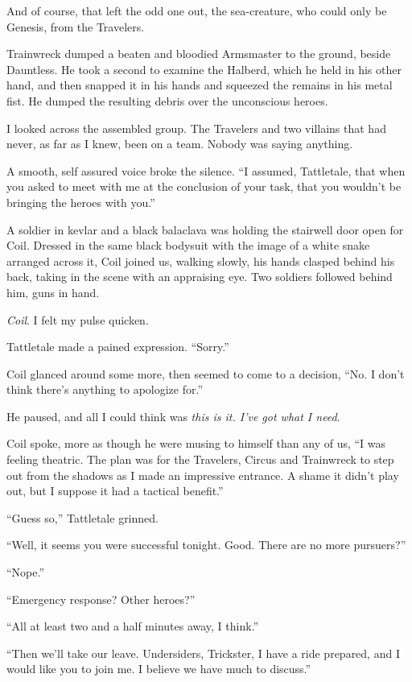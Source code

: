 And of course, that left the odd one out, the sea-creature, who could only be Genesis, from the Travelers.



Trainwreck dumped a beaten and bloodied Armsmaster to the ground, beside Dauntless.  He took a second to examine the Halberd, which he held in his other hand, and then snapped it in his hands and squeezed the remains in his metal fist.  He dumped the resulting debris over the unconscious heroes.



I looked across the assembled group.  The Travelers and two villains that had never, as far as I knew, been on a team.  Nobody was saying anything.



A smooth, self assured voice broke the silence.  ``I assumed, Tattletale, that when you asked to meet with me at the conclusion of your task, that you wouldn't be bringing the heroes with you.''



A soldier in kevlar and a black balaclava was holding the stairwell door open for Coil.  Dressed in the same black bodysuit with the image of a white snake arranged across it, Coil joined us, walking slowly, his hands clasped behind his back, taking in the scene with an appraising eye.  Two soldiers followed behind him, guns in hand.



\emph{Coil}.  I felt my pulse quicken.



Tattletale made a pained expression.  ``Sorry.''



Coil glanced around some more, then seemed to come to a decision, ``No.  I don't think there's anything to apologize for.''



He paused, and all I could think was \emph{this is it.  I've got what I need}.



Coil spoke, more as though he were musing to himself than any of us, ``I was feeling theatric.  The plan was for the Travelers, Circus and Trainwreck to step out from the shadows as I made an impressive entrance.  A shame it didn't play out, but I suppose it had a tactical benefit.''



``Guess so,'' Tattletale grinned.



``Well, it seems you were successful tonight.  Good.  There are no more pursuers?''



``Nope.''



``Emergency response?  Other heroes?''



``All at least two and a half minutes away, I think.''



``Then we'll take our leave.  Undersiders, Trickster, I have a ride prepared, and I would like you to join me.  I believe we have much to discuss.''





